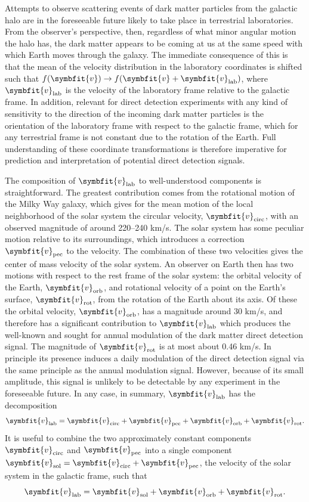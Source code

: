 \documentclass[b5paper, 10pt, twoside]{book}
\renewcommand{\vec}[1]{\symbfit{#1}}
\begin{document}
Attempts to observe scattering events of dark matter particles from the galactic halo are in the foreseeable future likely to take place in terrestrial laboratories. From the observer's perspective, then, regardless of what minor angular motion the halo has, the dark matter appears to be coming at us at the same speed with which Earth moves through the galaxy. The immediate consequence of this is that the mean of the velocity distribution in the laboratory coordinates is shifted such that $f(\vec{v})\rightarrow f(\vec{v}+\vec{v}_\text{lab})$, where $\vec{v}_\text{lab}$ is the velocity of the laboratory frame relative to the galactic frame. In addition, relevant for direct detection experiments with any kind of sensitivity to the direction of the incoming dark matter particles is the orientation of the laboratory frame with respect to the galactic frame, which for any terrestrial frame is not constant due to the rotation of the Earth. Full understanding of these coordinate transformations is therefore imperative for prediction and interpretation of potential direct detection signals.

The composition of $\vec{v}_\text{lab}$ to well-understood components is straightforward. The greatest contribution comes from the rotational motion of the Milky Way galaxy, which gives for the mean motion of the local neighborhood of the solar system the circular velocity, $\vec{v}_\text{circ}$, with an observed magnitude of around 220--240 km/s. The solar system has some peculiar motion relative to its surroundings, which introduces a correction $\vec{v}_\text{pec}$ to the velocity. The combination of these two velocities gives the center of mass velocity of the solar system. An observer on Earth then has two motions with respect to the rest frame of the solar system: the orbital velocity of the Earth, $\vec{v}_\text{orb}$, and rotational velocity of a point on the Earth's surface, $\vec{v}_\text{rot}$, from the rotation of the Earth about its axis. Of these the orbital velocity, $\vec{v}_\text{orb}$, has a magnitude around 30 km/s, and therefore has a significant contribution to $\vec{v}_\text{lab}$ which produces the well-known and sought for annual modulation of the dark matter direct detection signal. The magnitude of $\vec{v}_\text{rot}$ is at most about 0.46 km/s. In principle its presence induces a daily modulation of the direct detection signal via the same principle as the annual modulation signal. However, because of its small amplitude, this signal is unlikely to be detectable by any experiment in the foreseeable future. In any case, in summary, $\vec{v}_\text{lab}$ has the decomposition
\begin{equation}
    \vec{v}_\text{lab}=\vec{v}_\text{circ}+\vec{v}_\text{pec}+\vec{v}_\text{orb}+\vec{v}_\text{rot}.
\end{equation}
It is useful to combine the two approximately constant components $\vec{v}_\text{circ}$ and $\vec{v}_\text{pec}$ into a single component $\vec{v}_\text{sol}=\vec{v}_\text{circ}+\vec{v}_\text{pec}$, the velocity of the solar system in the galactic frame, such that
\begin{equation}
    \vec{v}_\text{lab}=\vec{v}_\text{sol}+\vec{v}_\text{orb}+\vec{v}_\text{rot}.
\end{equation}
\end{document}
